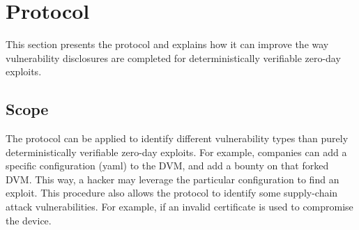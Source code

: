 \section{Protocol}
\label{sec:protocol}
This section presents the protocol and explains how it can improve the way vulnerability disclosures are completed for deterministically verifiable zero-day exploits.

\subsection{Scope}\label{subsec:scope}
The protocol can be applied to identify different vulnerability types than purely deterministically verifiable zero-day exploits. For example, companies can add a specific configuration (yaml) to the DVM, and add a bounty on that forked DVM. This way, a hacker may leverage the particular configuration to find an exploit. This procedure also allows the protocol to identify some supply-chain attack vulnerabilities. For example, if an invalid certificate is used to compromise the device.

